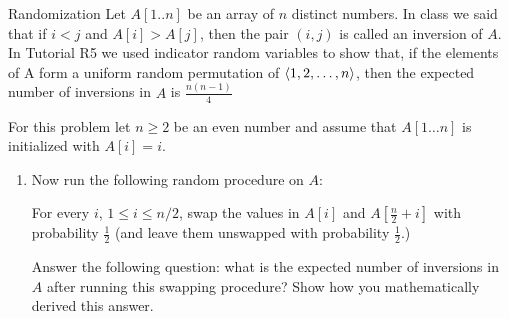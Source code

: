 \documentclass{article}
\begin{document}
\begin{section}{Randomization}
Let $A[1..n]$ be an array of $n$ distinct numbers. In class we said that if $i < j$ and $A[i] > A[j]$, then the pair $(i, j)$ is called an inversion of $A$. In Tutorial R5 we used indicator random variables to show that, if the elements of A form a uniform random permutation of $\left<1, 2, \dots, n\right>$, then the expected number of inversions in $A$ is $\frac{n(n-1)}{4}$

For this problem let $n \geq 2$ be an even number and assume that $A[1 \dots n]$ is initialized with $A[i] = i$.

\begin{enumerate}
    \item Now run the following random procedure on $A$:
    
    For every $i$, $1 \leq i \leq n/2$, swap the values in $A[i]$ and $A[\frac{n}{2} + i]$ with probability $\frac{1}{2}$ (and leave them unswapped with probability $\frac{1}{2}$.)
    
    Answer the following question:
    what is the expected number of inversions in $A$ after running this swapping procedure? Show how you mathematically derived this answer.
    
    \begin{figure}[h]
        \centering
\end{figure}
\end{enumerate}
\end{section}
\end{document}
